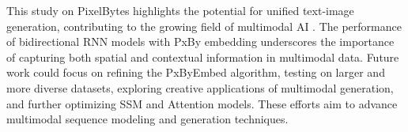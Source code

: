 \documentclass[10pt,a4paper]{article}
\begin{document}
This study on PixelBytes highlights the potential for unified text-image generation, contributing to the growing field of multimodal AI \cite{baltruvsaitis2018multimodal}. The performance of bidirectional RNN models with PxBy embedding underscores the importance of capturing both spatial and contextual information in multimodal data. Future work could focus on refining the PxByEmbed algorithm, testing on larger and more diverse datasets, exploring creative applications of multimodal generation, and further optimizing SSM and Attention models. These efforts aim to advance multimodal sequence modeling and generation techniques.



\end{document}
